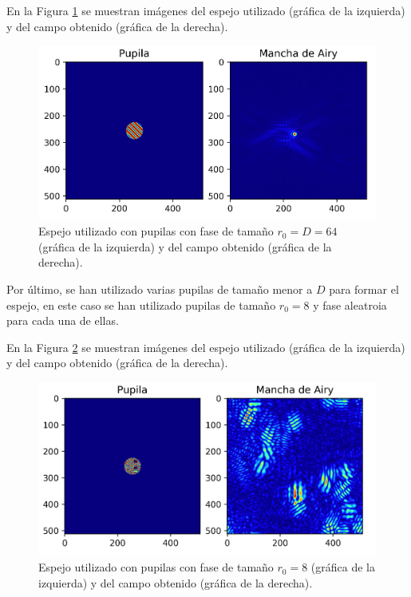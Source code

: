 \documentclass[twoside]{article}
\begin{document}
\begin{multicols}{2}
				En la Figura \ref{Img:airy-fase} se muestran imágenes del espejo utilizado (gráfica de la izquierda) y del campo obtenido (gráfica de la derecha).

					\begin{figure}[H]
						\centering
						\includegraphics[scale=0.2]{Airy_Fase.png}
						\caption{\label{Img:airy-fase}Espejo utilizado con pupilas con fase de tamaño $r_0 = D = 64$ (gráfica de la izquierda) y del campo obtenido (gráfica de la derecha).}
					\end{figure}

				Por último, se han utilizado varias pupilas de tamaño menor a $D$ para formar el espejo, en este caso se han utilizado pupilas de tamaño $r_0 = 8$ y fase aleatroia para cada una de ellas.

				En la Figura \ref{Img:speckle} se muestran imágenes del espejo utilizado (gráfica de la izquierda) y del campo obtenido (gráfica de la derecha).

				\begin{figure}[H]
					\centering
					\includegraphics[scale=0.2]{SpeckleTotal.png}
					\caption{\label{Img:speckle}Espejo utilizado con pupilas con fase de tamaño $r_0 = 8$ (gráfica de la izquierda) y del campo obtenido (gráfica de la derecha).}
				\end{figure}


\end{multicols}
\end{document}
